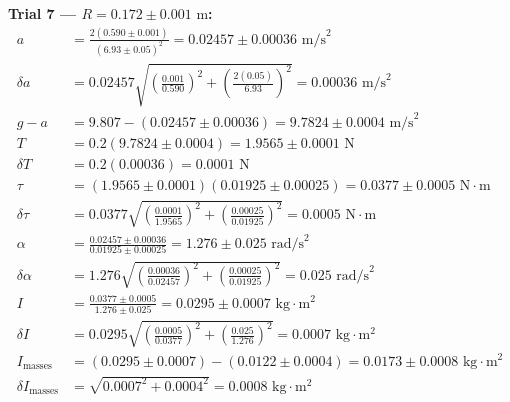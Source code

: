 \documentclass[11pt]{article}
\begin{document}
\textbf{Trial 7 — $R = 0.172 \pm 0.001\text{ m}$:}
\begin{align*}
a &= \frac{2(0.590 \pm 0.001)}{(6.93 \pm 0.05)^2} = 0.02457 \pm 0.00036\text{ m/s}^2 \\
\delta a &= 0.02457\sqrt{\left(\frac{0.001}{0.590}\right)^2 + \left(\frac{2(0.05)}{6.93}\right)^2} = 0.00036\text{ m/s}^2 \\
g - a &= 9.807 - (0.02457 \pm 0.00036) = 9.7824 \pm 0.0004\text{ m/s}^2 \\
T &= 0.2(9.7824 \pm 0.0004) = 1.9565 \pm 0.0001\text{ N} \\
\delta T &= 0.2(0.00036) = 0.0001\text{ N} \\
\tau &= (1.9565 \pm 0.0001)(0.01925 \pm 0.00025) = 0.0377 \pm 0.0005\text{ N}\cdot\text{m} \\
\delta\tau &= 0.0377\sqrt{\left(\frac{0.0001}{1.9565}\right)^2 + \left(\frac{0.00025}{0.01925}\right)^2} = 0.0005\text{ N}\cdot\text{m} \\
\alpha &= \frac{0.02457 \pm 0.00036}{0.01925 \pm 0.00025} = 1.276 \pm 0.025\text{ rad/s}^2 \\
\delta\alpha &= 1.276\sqrt{\left(\frac{0.00036}{0.02457}\right)^2 + \left(\frac{0.00025}{0.01925}\right)^2} = 0.025\text{ rad/s}^2 \\
I &= \frac{0.0377 \pm 0.0005}{1.276 \pm 0.025} = 0.0295 \pm 0.0007\text{ kg}\cdot\text{m}^2 \\
\delta I &= 0.0295\sqrt{\left(\frac{0.0005}{0.0377}\right)^2 + \left(\frac{0.025}{1.276}\right)^2} = 0.0007\text{ kg}\cdot\text{m}^2 \\
I_{\text{masses}} &= (0.0295 \pm 0.0007) - (0.0122 \pm 0.0004) = 0.0173 \pm 0.0008\text{ kg}\cdot\text{m}^2 \\
\delta I_{\text{masses}} &= \sqrt{0.0007^2 + 0.0004^2} = 0.0008\text{ kg}\cdot\text{m}^2
\end{align*}
\end{document}
